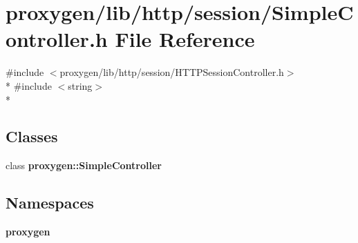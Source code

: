 \section{proxygen/lib/http/session/\+Simple\+Controller.h File Reference}
\label{SimpleController_8h}
{\ttfamily \#include $<$proxygen/lib/http/session/\+H\+T\+T\+P\+Session\+Controller.\+h$>$}\\*
{\ttfamily \#include $<$string$>$}\\*
\subsection*{Classes}
\begin{DoxyCompactItemize}
\item 
class {\bf proxygen\+::\+Simple\+Controller}
\end{DoxyCompactItemize}
\subsection*{Namespaces}
\begin{DoxyCompactItemize}
\item 
 {\bf proxygen}
\end{DoxyCompactItemize}
